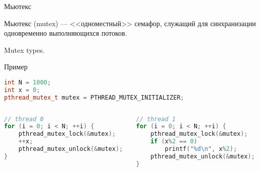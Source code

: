 \begin{frame}{Мьютекс}

Мьютекс (\abbr mutex) --- <<одноместный>> семафор, служащий для синхранизации одновременно выполняющихся потоков.

\todo Mutex types.

\end{frame}

\begin{frame}[fragile]{Пример}

\begin{lstlisting}[language=C++,basicstyle=\ttfamily,keywordstyle=\color{blue},basicstyle=\scriptsize]
int N = 1000;
int x = 0;
pthread_mutex_t mutex = PTHREAD_MUTEX_INITIALIZER;
\end{lstlisting}

\begin{columns}[t]
    \begin{column}[T]{0.5\textwidth}
    \begin{lstlisting}[language=C++,basicstyle=\ttfamily,keywordstyle=\color{blue},basicstyle=\scriptsize]
// thread 0
for (i = 0; i < N; ++i) {
    pthread_mutex_lock(&mutex);
    ++x;
    pthread_mutex_unlock(&mutex);
}
    \end{lstlisting}
    \end{column}
    \begin{column}[T]{0.5\textwidth}
    \begin{lstlisting}[language=C++,basicstyle=\ttfamily,keywordstyle=\color{blue},basicstyle=\scriptsize]
// thread 1
for (i = 0; i < N; ++i) {
    pthread_mutex_lock(&mutex);
    if (x%2 == 0)
        printf("%d\n", x%2);
    pthread_mutex_unlock(&mutex);
}
    \end{lstlisting}
    \end{column}
\end{columns}

\end{frame}

